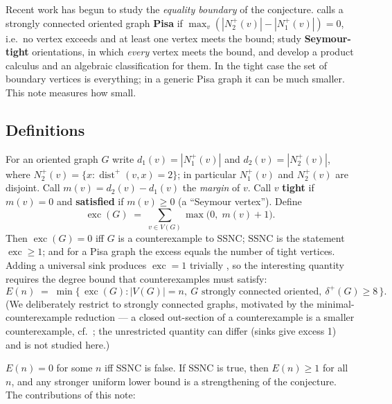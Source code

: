 \documentclass[11pt]{amsart}
\theoremstyle{remark}
\newcommand{\exc}{\operatorname{exc}}
\begin{document}
Recent work has begun to study the \emph{equality boundary} of the
conjecture. \cite{Halkiewicz2026} calls a strongly connected oriented graph
\textbf{Pisa} if $\max_v (|N_2^+(v)| - |N_1^+(v)|) = 0$, i.e.\ no vertex
exceeds and at least one vertex meets the bound;
\cite{GuoKangZwaneveld2026} study \textbf{Seymour-tight} orientations, in
which \emph{every} vertex meets the bound, and develop a product calculus and
an algebraic classification for them. In the tight case the set of boundary
vertices is everything; in a generic Pisa graph it can be much smaller. This
note measures how small.

\subsection*{Definitions}
For an oriented graph $G$ write $d_1(v) = |N_1^+(v)|$ and
$d_2(v) = |N_2^+(v)|$, where
$N_2^+(v) = \{x : \operatorname{dist}^+(v, x) = 2\}$; in particular
$N_1^+(v)$ and $N_2^+(v)$ are disjoint. Call $m(v) = d_2(v) - d_1(v)$ the
\emph{margin} of $v$. Call $v$
\textbf{tight} if $m(v) = 0$ and \textbf{satisfied} if $m(v) \ge 0$ (a
``Seymour vertex''). Define
\[
\exc(G) \;=\; \sum_{v \in V(G)} \max\bigl(0,\; m(v) + 1\bigr).
\]
Then $\exc(G) = 0$ iff $G$ is a counterexample to SSNC; SSNC is the statement
$\exc \ge 1$; and for a Pisa graph the excess equals the number of tight
vertices. Adding a universal sink produces $\exc = 1$ trivially
\cite[\S1]{GuoKangZwaneveld2026}, so the interesting quantity requires the
degree bound that counterexamples must satisfy:
\[
E(n) \;=\; \min\{\, \exc(G) : |V(G)| = n,\ G \text{ strongly connected
oriented},\ \delta^+(G) \ge 8 \,\}.
\]
(We deliberately restrict to strongly connected graphs, motivated by the
minimal-counterexample reduction --- a closed out-section of a
counterexample is a smaller counterexample, cf.\
\cite{EspunyDiazGiraoGranetKronenberg2024}; the unrestricted quantity can
differ (sinks give excess 1) and is not studied here.)

$E(n) = 0$ for some $n$ iff SSNC is false. If SSNC is true, then
$E(n) \ge 1$ for all $n$, and any stronger uniform lower bound is a
strengthening of the conjecture. The contributions of this note:
\end{document}
